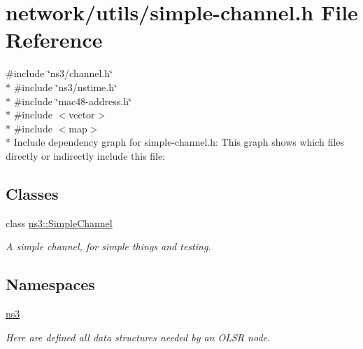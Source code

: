 \hypertarget{simple-channel_8h}{}\section{network/utils/simple-\/channel.h File Reference}
\label{simple-channel_8h}
{\ttfamily \#include \char`\"{}ns3/channel.\+h\char`\"{}}\\*
{\ttfamily \#include \char`\"{}ns3/nstime.\+h\char`\"{}}\\*
{\ttfamily \#include \char`\"{}mac48-\/address.\+h\char`\"{}}\\*
{\ttfamily \#include $<$vector$>$}\\*
{\ttfamily \#include $<$map$>$}\\*
Include dependency graph for simple-\/channel.h\+:
This graph shows which files directly or indirectly include this file\+:
\subsection*{Classes}
\begin{DoxyCompactItemize}
\item 
class \hyperlink{classns3_1_1SimpleChannel}{ns3\+::\+Simple\+Channel}
\begin{DoxyCompactList}\small\item\em A simple channel, for simple things and testing. \end{DoxyCompactList}\end{DoxyCompactItemize}
\subsection*{Namespaces}
\begin{DoxyCompactItemize}
\item 
 \hyperlink{namespacens3}{ns3}
\begin{DoxyCompactList}\small\item\em Here are defined all data structures needed by an O\+L\+SR node. \end{DoxyCompactList}\end{DoxyCompactItemize}
